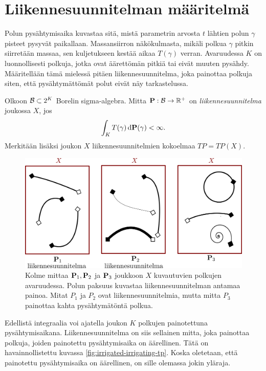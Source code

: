 \documentclass[12pt,oneside,a4paper]{amsbook} %
\begin{document}
\section{Liikennesuunnitelman määritelmä}

Polun pysähtymisaika kuvastaa sitä, mistä parametrin arvosta $t$ lähtien polun $\gamma$ pisteet pysyvät paikallaan. Massansiirron näkökulmasta, mikäli polkua $\gamma$ pitkin siirretään massaa, sen kuljetukseen kestää aikaa $T(\gamma)$ verran. Avaruudessa $K$ on luonnollisesti polkuja, jotka ovat äärettömän pitkiä tai eivät muuten pysähdy. Määritellään tämä mielessä pitäen liikennesuunnitelma, joka painottaa polkuja siten, että pysähtymättömät polut eivät näy tarkastelussa.

\begin{definition}\label{def:liikennesuunnitelma}
    Olkoon $\Borel \subset 2^K$ Borelin sigma-algebra. Mitta $\P: \Borel \to \R^+$ on \textit{liikennesuunnitelma} joukossa $X$, jos
    \begin{equation*}
     \int_K T(\gamma) \, \d \P (\gamma) < \infty.   
    \end{equation*}
    Merkitään lisäksi joukon $X$ liikennesuunnitelmien kokoelmaa $TP = TP(X)$.
\end{definition}
\begin{figure}
    \centering
    \includegraphics[scale=0.2]{graphics/trafficplan.png}
    \caption{Kolme mittaa $\P_1, \P_2$ ja $\P_3$ joukkoon $X$ kuvautuvien polkujen avaruudessa. Polun paksuus kuvastaa liikennesuunnitelman antamaa painoa. Mitat $P_1$ ja $P_2$ ovat liikennesuunnitelmia, mutta mitta $P_3$ painottaa kahta pysähtymätöntä polkua.}
    \label{fig:my_label}
\end{figure}
Edellistä integraalia voi ajatella joukon $K$ polkujen painotettuna pysähtymisaikana. Liikennesuunnitelma on siis sellainen mitta, joka painottaa polkuja, joiden painotettu pysähtymisaika on äärellinen. Tätä on havainnollistettu kuvassa \ref{fig:irrigated-irrigating-tp}. Koska oletetaan, että painotettu pysähtymisaika on äärellinen, on sille olemassa jokin yläraja.
\end{document}
